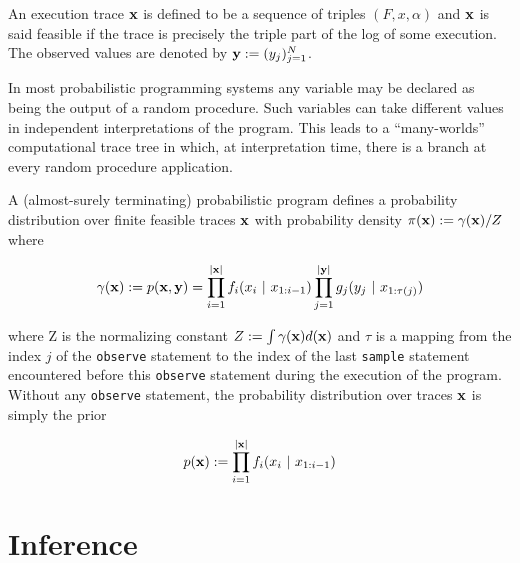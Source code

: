 An execution trace $\boldsymbol{\mathbf{x}}$ is defined to be a sequence of triples $(F, x, \alpha)$ and $\boldsymbol{\mathbf{x}}$ is said feasible if the trace is precisely the triple part of the log of some execution.
The observed values are denoted by $\boldsymbol{\mathbf{y}} := (y_j)_{j=1}^N$.

In most probabilistic programming systems any variable may be declared as being the output of a random procedure. Such variables can take different values in independent interpretations of the program. This leads to a ``many-worlds'' computational trace tree in which, at interpretation time, there is a branch at every random procedure application.


A (almost-surely terminating) probabilistic program defines a probability distribution over finite feasible traces $\boldsymbol{\mathbf{x}}$ with probability density $\pi(\boldsymbol{\mathbf{x}}) := \gamma(\boldsymbol{\mathbf{x}}) / Z$ where 

\begin{equation*}
\gamma(\boldsymbol{\mathbf{x}}) := p(\boldsymbol{\mathbf{x}}, \boldsymbol{\mathbf{y}}) = \prod_{i=1}^{|\boldsymbol{\mathbf{x}}|}{f_{i}(x_i~|~x_{1:i-1})} \prod_{j=1}^{|\boldsymbol{\mathbf{y}}|}{g_j(y_j~|~x_{1:\tau(j)})}
\end{equation*}

where Z is the normalizing constant $Z := \int{\gamma(\ensuremath{\boldsymbol{\mathbf{x}}}) d(\ensuremath{\boldsymbol{\mathbf{x}}})}$ and $\tau$ is a mapping from the index $j$ of the \texttt{observe} statement to the index of the last \texttt{sample} statement encountered before this \texttt{observe} statement during the execution of the program. Without any \texttt{observe} statement, the probability distribution over traces $\boldsymbol{\mathbf{x}}$ is simply the prior

\begin{equation*}
p(\boldsymbol{\mathbf{x}}) := \prod_{i=1}^{|\boldsymbol{\mathbf{x}}|}{f_{i}(x_i~|~x_{1:i-1})}
\end{equation*}

\section{Inference}

